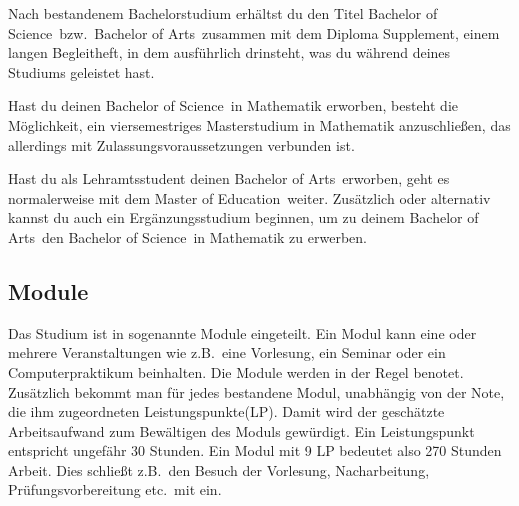 Nach bestandenem Bachelorstudium erhältst du den Titel
\glqq Bachelor of Science\grqq\ bzw.\ 
\glqq Bachelor of Arts\grqq\  zusammen mit dem
\glqq Diploma Supplement\grqq, einem langen Begleitheft,
in dem ausführlich drinsteht,
was du während deines Studiums geleistet hast.

Hast du deinen \glqq Bachelor of Science\grqq\ 
in Mathematik erworben, besteht die Möglichkeit,
ein viersemestriges Masterstudium in Mathematik anzuschließen,
das allerdings mit Zulassungsvoraussetzungen verbunden ist.

Hast du als Lehramtsstudent
deinen \glqq Bachelor of Arts\grqq\ erworben,
geht es normalerweise mit dem \glqq Master of Education\grqq\ weiter.
Zusätzlich oder alternativ kannst du auch ein Ergänzungsstudium beginnen,
um zu deinem \glqq Bachelor of Arts\grqq\ 
den \glqq Bachelor of Science\grqq\  in Mathematik zu erwerben.



\subsection{Module}
Das Studium ist in sogenannte Module eingeteilt.
Ein Modul kann eine oder mehrere Veranstaltungen wie
z.B.\ eine Vorlesung, ein Seminar oder ein Computerpraktikum beinhalten.
Die Module werden in der Regel benotet.
Zusätzlich bekommt man für jedes bestandene Modul,
unabhängig von der Note,
die ihm zugeordneten \glqq Leistungspunkte\grqq (LP).
Damit wird der geschätzte Arbeitsaufwand
zum Bewältigen des Moduls gewürdigt.
Ein Leistungspunkt entspricht ungefähr 30 Stunden.
Ein Modul mit 9 LP bedeutet also 270 Stunden Arbeit.
Dies schließt z.B.\ den Besuch der Vorlesung, Nacharbeitung,
Prüfungsvorbereitung etc.\ mit ein.

